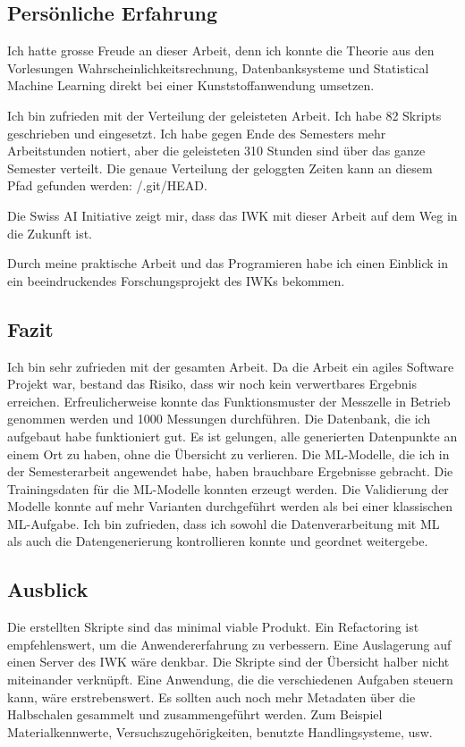 \subsection{Persönliche Erfahrung}
Ich hatte grosse Freude an dieser Arbeit, denn ich konnte die Theorie aus den Vorlesungen Wahrscheinlichkeitsrechnung, Datenbanksysteme und Statistical Machine Learning direkt bei einer Kunststoffanwendung umsetzen.

Ich bin zufrieden mit der Verteilung der geleisteten Arbeit. Ich habe 82 Skripts geschrieben und eingesetzt. Ich habe gegen Ende des Semesters mehr Arbeitstunden notiert, aber die geleisteten 310 Stunden sind über das ganze Semester verteilt. Die genaue Verteilung der geloggten Zeiten kann an diesem Pfad gefunden werden: /.git/HEAD.

Die Swiss AI Initiative zeigt mir, dass das IWK mit dieser Arbeit auf dem Weg in die Zukunft ist.

Durch meine praktische Arbeit und das Programieren habe ich einen Einblick in ein beeindruckendes Forschungsprojekt des IWKs bekommen.

\subsection{Fazit}
Ich bin sehr zufrieden mit der gesamten Arbeit. Da die Arbeit ein agiles Software Projekt war, bestand das Risiko, dass wir noch kein verwertbares Ergebnis erreichen. Erfreulicherweise konnte das Funktionsmuster der Messzelle in Betrieb genommen werden und 1000 Messungen durchführen. Die Datenbank, die ich aufgebaut habe funktioniert gut. Es ist gelungen, alle generierten Datenpunkte an einem Ort zu haben, ohne die Übersicht zu verlieren. Die ML-Modelle, die ich in der Semesterarbeit angewendet habe, haben brauchbare Ergebnisse gebracht. Die Trainingsdaten für die ML-Modelle konnten erzeugt werden. Die Validierung der Modelle konnte auf mehr Varianten durchgeführt werden als bei einer klassischen ML-Aufgabe. Ich bin zufrieden, dass ich sowohl die Datenverarbeitung mit ML als auch die Datengenerierung kontrollieren konnte und geordnet weitergebe. 

\subsection{Ausblick}
Die erstellten Skripte sind das minimal viable Produkt. Ein Refactoring ist empfehlenswert, um die Anwendererfahrung zu verbessern. Eine Auslagerung auf einen Server des IWK wäre denkbar. Die Skripte sind der Übersicht halber nicht miteinander verknüpft. Eine Anwendung, die die verschiedenen Aufgaben steuern kann, wäre erstrebenswert. Es sollten auch noch mehr Metadaten über die Halbschalen gesammelt und zusammengeführt werden. Zum Beispiel Materialkennwerte, Versuchszugehörigkeiten, benutzte Handlingsysteme, usw.

